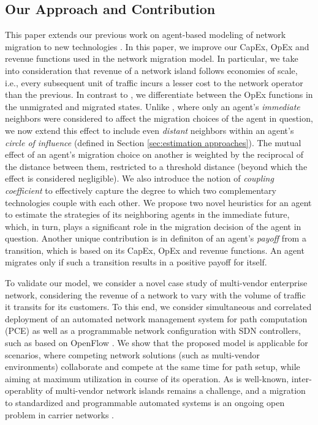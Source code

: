 \documentclass[smallextended]{svjour3}
\begin{document}
\subsection{Our Approach and Contribution}
\par This paper extends our previous work on agent-based modeling of network
migration to new technologies \cite{netmig-icc2013}. In this paper, we improve
our CapEx, OpEx and revenue functions used in the network migration model. In
particular, we take into consideration that revenue of a network island follows
economies of scale, i.e.,  every subsequent unit of traffic incurs a lesser cost
to the network operator than the previous. In contrast to \cite{netmig-icc2013},
we differentiate between the OpEx functions in the unmigrated and migrated
states. Unlike \cite{netmig-icc2013}, where only an agent's \emph{immediate}
neighbors were considered to affect the migration choices of the agent in
question, we now extend this effect to include even \emph{distant} neighbors within an
agent's \emph{circle of influence} (defined in Section \ref{sec:estimation
approaches}). The mutual effect of an agent's migration choice on another is
weighted by the reciprocal of the distance between them, restricted to a
threshold distance (beyond which the effect is considered negligible). We also
introduce the notion of \emph{coupling coefficient} to effectively capture the
degree to which two complementary technologies couple with each other. We
propose two novel heuristics for an agent to estimate the strategies of its
neighboring agents in the immediate future, which, in turn, plays a significant
role in the migration decision of the agent in question. Another unique
contribution is in definiton of an agent's
\emph{payoff} from a transition, which is based on its CapEx, OpEx and
revenue functions. An agent migrates only if such a transition results in a
positive payoff for itself.

\par To validate our model, we consider a novel case study of multi-vendor
enterprise network, considering the revenue of a network to vary with the
volume of traffic it transits for its customers. To this end, we consider
simultaneous and correlated deployment of an automated network management system
for path computation (PCE) as well as a programmable network configuration with
SDN controllers, such as based on OpenFlow \cite{openflow}.  We show that the
proposed model is applicable for scenarios, where competing network solutions
(such as multi-vendor environments) collaborate and compete at the same time for
path setup, while aiming at maximum utilization in course of its operation. As
is well-known, inter-operablity of multi-vendor network islands remains
a challenge, and a migration to standardized and programmable automated systems
is an ongoing open problem in carrier networks \cite{ONE}.
\end{document}
